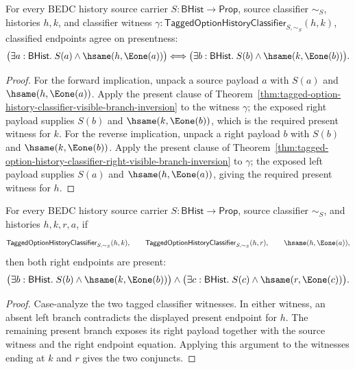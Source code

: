 \begin{theorem}
\label{thm:tagged-option-history-classifier-present-branch-equivalence}
For every BEDC history source carrier $S:\mathsf{BHist}\to\mathsf{Prop}$, source classifier $\sim_S$, histories $h,k$, and classifier witness $\gamma:\mathsf{TaggedOptionHistoryClassifier}_{S,\sim_S}(h,k)$, classified endpoints agree on presentness:
$$
\bigl(\exists a:\mathsf{BHist}.\; S(a)\land\hsame(h,\Eone(a))\bigr)
\Longleftrightarrow
\bigl(\exists b:\mathsf{BHist}.\; S(b)\land\hsame(k,\Eone(b))\bigr).
$$
\end{theorem}
\begin{proof}
For the forward implication, unpack a source payload $a$ with $S(a)$ and
$\hsame(h,\Eone(a))$. Apply the present clause of
Theorem~\ref{thm:tagged-option-history-classifier-visible-branch-inversion} to
the witness $\gamma$; the exposed right payload supplies $S(b)$ and
$\hsame(k,\Eone(b))$, which is the required present witness for $k$. For the
reverse implication, unpack a right payload $b$ with $S(b)$ and
$\hsame(k,\Eone(b))$. Apply the present clause of
Theorem~\ref{thm:tagged-option-history-classifier-right-visible-branch-inversion}
to $\gamma$; the exposed left payload supplies $S(a)$ and
$\hsame(h,\Eone(a))$, giving the required present witness for $h$.
\end{proof}

\begin{theorem}
\label{thm:tagged-option-history-classifier-left-present-endpoint-fanout}
For every BEDC history source carrier $S:\mathsf{BHist}\to\mathsf{Prop}$,
source classifier $\sim_S$, and histories $h,k,r,a$, if
$$
\mathsf{TaggedOptionHistoryClassifier}_{S,\sim_S}(h,k),\qquad
\mathsf{TaggedOptionHistoryClassifier}_{S,\sim_S}(h,r),\qquad
\hsame(h,\Eone(a)),
$$
then both right endpoints are present:
$$
\bigl(\exists b:\mathsf{BHist}.\;S(b)\land\hsame(k,\Eone(b))\bigr)
\land
\bigl(\exists c:\mathsf{BHist}.\;S(c)\land\hsame(r,\Eone(c))\bigr).
$$
\end{theorem}
\begin{proof}
Case-analyze the two tagged classifier witnesses. In either witness, an absent
left branch contradicts the displayed present endpoint for $h$. The remaining
present branch exposes its right payload together with the source witness and
the right endpoint equation. Applying this argument to the witnesses ending at
$k$ and $r$ gives the two conjuncts.
\end{proof}

